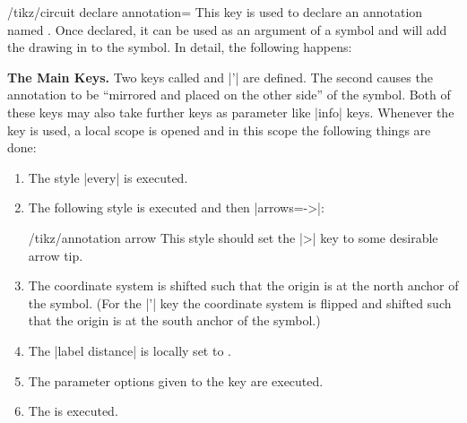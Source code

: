 \begin{key}{/tikz/circuit declare annotation=}
    This key is used to declare an annotation named . Once declared,
    it can be used as an argument of a symbol and will add the drawing in
     to the symbol. In detail, the following happens:


    \textbf{The Main Keys.}
    Two keys called  and |'| are defined. The second
    causes the annotation to be ``mirrored and placed on the other side'' of
    the symbol. Both of these keys may also take further keys as parameter like
    |info| keys. Whenever the  key is used, a local scope is opened
    and in this scope the following things are done:
    \begin{enumerate}
        \item The style |every|  is executed.
        \item The following style is executed and then |arrows=->|:
            \begin{stylekey}{/tikz/annotation arrow}
                This style should set the |>| key to some desirable arrow tip.
            \end{stylekey}
        \item The coordinate system is shifted such that the origin is at the
            north anchor of the symbol. (For the |'| key the
            coordinate system is flipped and shifted such that the origin is at
            the south anchor of the symbol.)
        \item The |label distance| is locally set to .
        \item The parameter options given to the  key are executed.
        \item The  is executed.
    \end{enumerate}



\end{key}
